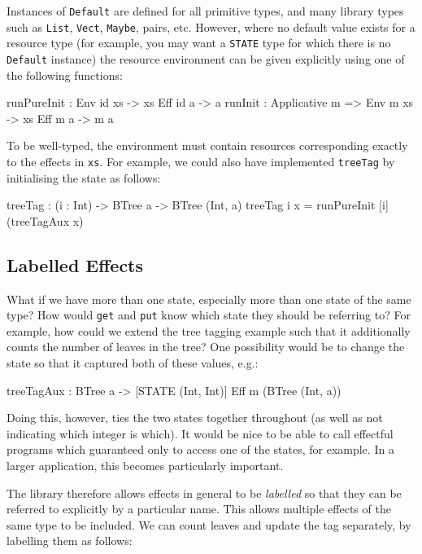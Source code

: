 \noindent
Instances of \texttt{Default} are defined for all primitive types, and many
library types such as \texttt{List}, \texttt{Vect}, \texttt{Maybe}, pairs,
etc. However, where no default value exists for a resource type (for example,
you may want a \texttt{STATE} type for which there is no \texttt{Default}
instance) the resource environment can be given explicitly using one of
the following functions:

\begin{code}
runPureInit : Env id xs -> { xs } Eff id a -> a
runInit : Applicative m => Env m xs -> { xs } Eff m a -> m a
\end{code}

\noindent
To be well-typed, the environment must contain resources corresponding exactly
to the effects in \texttt{xs}.
For example, we could also have implemented \texttt{treeTag} by initialising
the state as follows:

\begin{code}
treeTag : (i : Int) -> BTree a -> BTree (Int, a)
treeTag i x = runPureInit [i] (treeTagAux x)
\end{code}

\subsection{Labelled Effects}

What if we have more than one state, especially more than one state of the
same type? How would \texttt{get} and \texttt{put}
know which state they should be referring to? For example, how could we
extend the tree tagging example such that it additionally counts the number
of leaves in the tree?
%
One possibility would be to change the state so that it captured both of
these values, e.g.:

\begin{code}
treeTagAux : BTree a -> { [STATE (Int, Int)] } Eff m (BTree (Int, a))
\end{code}

\noindent
Doing this, however, ties the two states together throughout (as well as
not indicating which integer is which). It would be nice to be able to
call effectful programs which guaranteed only to access one of the states,
for example. In a larger application, this becomes particularly important.

The \effects{} library therefore allows effects in general to be
\emph{labelled} so that they can be referred to explicitly by a particular
name. This allows multiple effects of the same type to be included. We can
count leaves and update the tag separately, by labelling them as follows:

